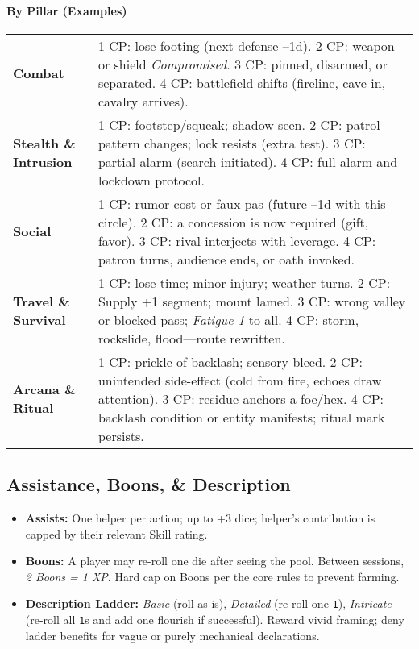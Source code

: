 \documentclass[12pt]{article}
\begin{document}
\paragraph{By Pillar (Examples)}
\begin{tabular}{@{}lp{11cm}@{}}
\toprule
\textbf{Combat} & 1 CP: lose footing (next defense --1d). 2 CP: weapon or shield \emph{Compromised}. 3 CP: pinned, disarmed, or separated. 4 CP: battlefield shifts (fireline, cave-in, cavalry arrives). \\
\textbf{Stealth \& Intrusion} & 1 CP: footstep/squeak; shadow seen. 2 CP: patrol pattern changes; lock resists (extra test). 3 CP: partial alarm (search initiated). 4 CP: full alarm and lockdown protocol. \\
\textbf{Social} & 1 CP: rumor cost or faux pas (future --1d with this circle). 2 CP: a concession is now required (gift, favor). 3 CP: rival interjects with leverage. 4 CP: patron turns, audience ends, or oath invoked. \\
\textbf{Travel \& Survival} & 1 CP: lose time; minor injury; weather turns. 2 CP: Supply +1 segment; mount lamed. 3 CP: wrong valley or blocked pass; \emph{Fatigue 1} to all. 4 CP: storm, rockslide, flood—route rewritten. \\
\textbf{Arcana \& Ritual} & 1 CP: prickle of backlash; sensory bleed. 2 CP: unintended side-effect (cold from fire, echoes draw attention). 3 CP: residue anchors a foe/hex. 4 CP: backlash condition or entity manifests; ritual mark persists. \\
\bottomrule
\end{tabular}

\subsection{Assistance, Boons, \& Description}
\begin{itemize}
  \item \textbf{Assists:} One helper per action; up to +3 dice; helper’s contribution is capped by their relevant Skill rating.
  \item \textbf{Boons:} A player may re-roll one die after seeing the pool. Between sessions, \emph{2 Boons = 1 XP}. Hard cap on Boons per the core rules to prevent farming.
  \item \textbf{Description Ladder:} \emph{Basic} (roll as-is), \emph{Detailed} (re-roll one \texttt{1}), \emph{Intricate} (re-roll all \texttt{1}s and add one flourish if successful). Reward vivid framing; deny ladder benefits for vague or purely mechanical declarations.
\end{itemize}
\end{document}
